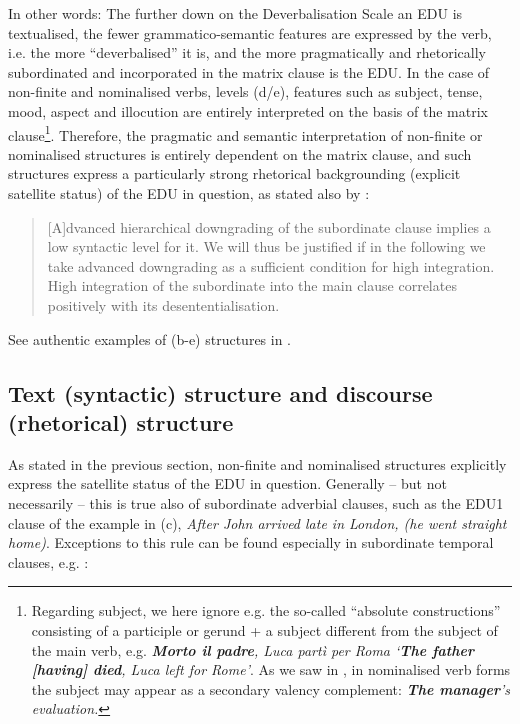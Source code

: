 \documentclass[output=paper]{LSP/langsci}
\begin{document}
In other words: The further down on the Deverbalisation Scale an EDU is textualised, the fewer grammatico-semantic features are expressed by the verb, i.e. the more ``deverbalised'' it is, and the more pragmatically and rhetorically subordinated and incorporated in the matrix clause is the EDU. In the case of non-finite and nominalised verbs, levels (d/e), features such as subject, tense, mood, aspect and illocution are entirely interpreted on the basis of the matrix clause\footnote{Regarding subject, we here ignore e.g. the so-called ``absolute constructions'' consisting of a participle or gerund + a subject different from the subject of the main verb, e.g. \textbf{\textit{Morto il padre}}\textit{, Luca partì per Roma `}\textbf{\textit{The father [having] died}}\textit{, Luca left for Rome'}. As we saw in , in nominalised verb forms the subject may appear as a secondary valency complement: \textbf{\textit{The manager}}\textit{'s evaluation.}}. Therefore, the pragmatic and semantic interpretation of non-finite or nominalised structures is entirely dependent on the matrix clause, and such structures express a particularly strong rhetorical backgrounding (explicit satellite status) of the EDU in question, as stated also by \citet[214]{Lehmann1988}:

\begin{quote}
[A]dvanced hierarchical downgrading of the subordinate clause implies a low syntactic level for it. We will thus be justified if in the following we take advanced downgrading as a sufficient condition for high integration. High integration of the subordinate into the main clause correlates positively with its desententialisation. 
\end{quote}

See authentic examples of (b-e) structures in  .

\subsection{Text (syntactic) structure and discourse (rhetorical) structure}\label{sec:korzen:3.5}

As stated in the previous section, non-finite and nominalised structures explicitly express the satellite status of the EDU in question. Generally -- but not necessarily -- this is true also of subordinate adverbial clauses, such as the EDU1 clause of the example in (c), \textit{After John arrived late in London, (he went straight home)}. Exceptions to this rule can be found especially in subordinate temporal clauses, e.g. :
\end{document}
